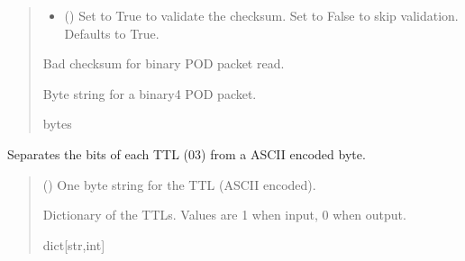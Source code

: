 \documentclass[letterpaper,10pt,english]{sphinxmanual}
\begin{document}
\begin{fulllineitems}
\begin{fulllineitems}
\begin{quote}
\begin{description}
\begin{itemize}
\item {} 
\sphinxAtStartPar
{} (\sphinxstyleliteralemphasis{\sphinxupquote{, }}) \textendash{} Set to True to validate the checksum. Set to False to                 skip validation. Defaults to True.

\end{itemize}

\sphinxAtStartPar
{} \textendash{} Bad checksum for binary POD packet read.

\sphinxAtStartPar
Byte string for a binary4 POD packet.

\sphinxAtStartPar
bytes

\end{description}\end{quote}

\end{fulllineitems}


\begin{fulllineitems}
\label{\detokenize{PodDevice_8206HR:PodDevice_8206HR.POD_8206HR._TranslateTTLbyte_ASCII}}
\pysigstartsignatures
{}
\pysigstopsignatures
\sphinxAtStartPar
Separates the bits of each TTL (0\sphinxhyphen{}3) from a ASCII encoded byte.
\begin{quote}\begin{description}
\sphinxAtStartPar
{} () \textendash{} One byte string for the TTL (ASCII encoded).

\sphinxAtStartPar
Dictionary of the TTLs. Values are 1 when input, 0 when output.

\sphinxAtStartPar
dict{[}str,int{]}


\end{description}
\end{quote}
\end{fulllineitems}
\end{fulllineitems}
\end{document}
